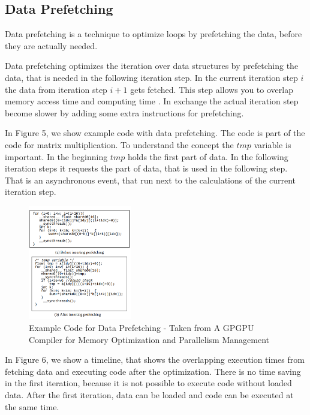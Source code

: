 \documentclass[conference]{IEEEtran}
\begin{document}
	\subsection{Data Prefetching}
		
		
		Data prefetching is a technique to optimize loops by prefetching the data, before they are actually needed.
		
		
		Data prefetching optimizes the iteration over data structures by prefetching the data, that is needed in the following iteration step. In the current iteration step $i$ the data from iteration step $i+1$ gets fetched. This step allows you to overlap memory access time and computing time \cite{GPGPUCompiler}. In exchange the actual iteration step become slower by adding some extra instructions for prefetching.
		
		In Figure 5, we show example code with data prefetching. The code is part of the code for matrix multiplication. To understand the concept the $tmp$ variable is important. In the beginning $tmp$ holds the first part of data. In the following iteration steps it requests the part of data, that is used in the following step. That is an asynchronous event, that run next to the calculations of the current iteration step. 
		
		\begin{figure}[htbp]
			\centerline{\includegraphics[width=0.4\textwidth]{DataPrefetchingCodeExample.png}}
			\caption{Example Code for Data Prefetching - Taken from  A GPGPU Compiler for Memory Optimization and Parallelism Management}
			\label{fig2}
		\end{figure}
	
		In Figure 6, we show a timeline, that shows the overlapping execution times from fetching data and executing code after the optimization. There is no time saving in the first iteration, because it is not possible to execute code without loaded data. After the first iteration, data can be loaded and code can be executed at the same time.
		
\end{document}
